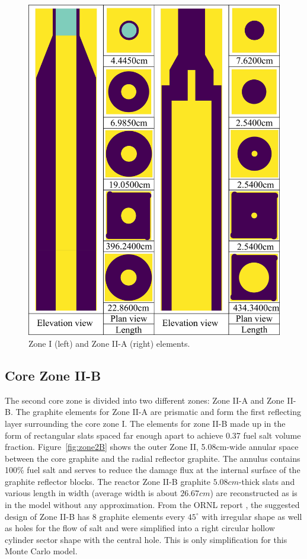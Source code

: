 \documentclass{anstrans}
\begin{document}
\begin{figure}[h] %
  \centering
  \includegraphics[width=0.96\linewidth]{figure_2_4.png}
  \caption{Zone I (left) and Zone II-A (right) elements.}
  \label{fig:zone12A}
\end{figure}

\subsection{Core Zone II-B}
The second core zone is divided into two different zones: Zone II-A and Zone II-B. The graphite elements for Zone II-A are prismatic and form the first reflecting layer surrounding the core zone I. The elements for zone II-B made up in the form of rectangular slats spaced far enough apart to achieve 0.37 fuel salt volume fraction. Figure~\ref{fig:zone2B} shows the outer Zone II, 5.08cm-wide annular space between the core graphite and the radial reflector graphite. The annulus contains 100\% fuel salt and serves to reduce the damage flux at the internal surface of the graphite reflector blocks. The reactor Zone II-B graphite $5.08cm$-thick slats and various length in width (average width is about $26.67cm$) are reconstructed as is in the model without any approximation. From the ORNL report \cite{robertson_conceptual_1971}, the suggested design of Zone II-B has 8 graphite elements every $45^\circ$ with irregular shape as well as holes for the flow of salt and were simplified into a right circular hollow cylinder sector shape with the central hole. This is only simplification for this Monte Carlo model.
\end{document}

